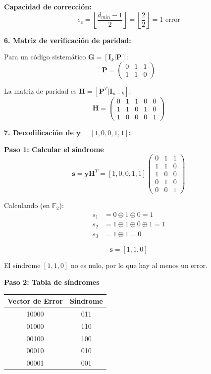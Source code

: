 \documentclass[10pt,a4paper]{article}
\begin{document}
\begin{solucion}
\textbf{Capacidad de corrección:}
\[
\boxed{e_c = \left\lfloor \frac{d_{min} - 1}{2} \right\rfloor = \left\lfloor \frac{2}{2} \right\rfloor = 1 \text{ error}}
\]

\textbf{6. Matriz de verificación de paridad:}

Para un código sistemático $\mathbf{G} = [\mathbf{I}_k | \mathbf{P}]$:
\[
\mathbf{P} = \begin{pmatrix} 0 & 1 & 1\\ 1 & 1 & 0 \end{pmatrix}
\]

La matriz de paridad es $\mathbf{H} = [\mathbf{P}^T | \mathbf{I}_{n-k}]$:
\[
\boxed{\mathbf{H} = \begin{pmatrix}
0 & 1 & 1 & 0 & 0\\
1 & 1 & 0 & 1 & 0\\
1 & 0 & 0 & 0 & 1
\end{pmatrix}}
\]

\textbf{7. Decodificación de $\mathbf{y} = [1, 0, 0, 1, 1]$:}

\textbf{Paso 1: Calcular el síndrome}
\[
\mathbf{s} = \mathbf{y} \mathbf{H}^T = [1, 0, 0, 1, 1] \begin{pmatrix}
0 & 1 & 1\\
1 & 1 & 0\\
1 & 0 & 0\\
0 & 1 & 0\\
0 & 0 & 1
\end{pmatrix}
\]

Calculando (en $\mathbb{F}_2$):
\begin{align*}
s_1 &= 0 \oplus 1 \oplus 0 = 1\\
s_2 &= 1 \oplus 1 \oplus 0 \oplus 1 = 1\\
s_3 &= 1 \oplus 1 = 0
\end{align*}

\[
\mathbf{s} = [1, 1, 0]
\]

El síndrome $[1, 1, 0]$ no es nulo, por lo que hay al menos un error.

\textbf{Paso 2: Tabla de síndromes}

\begin{center}
\begin{tabular}{|c|c|}
\hline
\textbf{Vector de Error} & \textbf{Síndrome} \\
\hline
10000 & 011 \\
01000 & 110 \\
00100 & 100 \\
00010 & 010 \\
00001 & 001 \\
\hline
\end{tabular}
\end{center}


\end{solucion}
\end{document}
